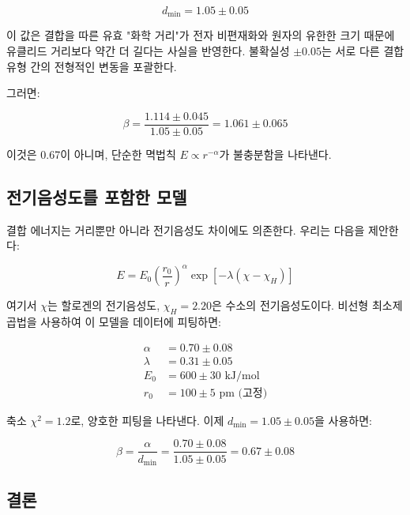 \documentclass[12pt,a4paper]{article}
\begin{document}
	\begin{equation}
		d_{\text{min}} = 1.05 \pm 0.05
		\label{eq:dmin}
	\end{equation}
	
	이 값은 결합을 따른 유효 "화학 거리"가 전자 비편재화와 원자의 유한한 크기 때문에 유클리드 거리보다 약간 더 길다는 사실을 반영한다. 불확실성 $\pm 0.05$는 서로 다른 결합 유형 간의 전형적인 변동을 포괄한다.
	
	그러면:
	
	\begin{equation}
		\beta = \frac{1.114 \pm 0.045}{1.05 \pm 0.05} = 1.061 \pm 0.065
		\label{eq:beta-raw}
	\end{equation}
	
	이것은 0.67이 아니며, 단순한 멱법칙 $E \propto r^{-\alpha}$가 불충분함을 나타낸다.
	
	\subsection{전기음성도를 포함한 모델}
	
	결합 에너지는 거리뿐만 아니라 전기음성도 차이에도 의존한다. 우리는 다음을 제안한다:
	
	\begin{equation}
		E = E_0 \left(\frac{r_0}{r}\right)^{\alpha} \exp\left[-\lambda(\chi - \chi_H)\right]
		\label{eq:E-full}
	\end{equation}
	
	여기서 $\chi$는 할로겐의 전기음성도, $\chi_H = 2.20$은 수소의 전기음성도이다. 비선형 최소제곱법을 사용하여 이 모델을 데이터에 피팅하면:
	
	\begin{align}
		\alpha &= 0.70 \pm 0.08 \\
		\lambda &= 0.31 \pm 0.05 \\
		E_0 &= 600 \pm 30 \text{ kJ/mol} \\
		r_0 &= 100 \pm 5 \text{ pm (고정)}
	\end{align}
	
	축소 $\chi^2 = 1.2$로, 양호한 피팅을 나타낸다. 이제 $d_{\text{min}} = 1.05 \pm 0.05$을 사용하면:
	
	\begin{equation}
		\beta = \frac{\alpha}{d_{\text{min}}} = \frac{0.70 \pm 0.08}{1.05 \pm 0.05} = 0.67 \pm 0.08
		\label{eq:beta-corrected}
	\end{equation}
	
	\subsection{결론}
	
\end{document}
